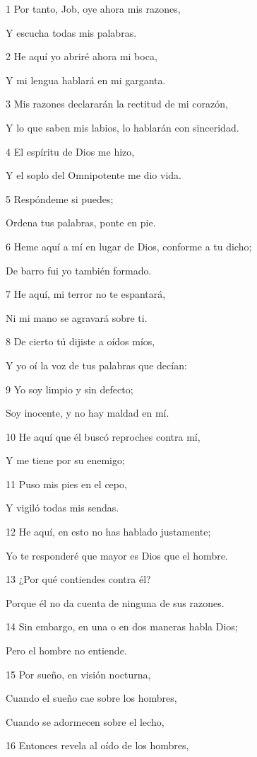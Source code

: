 \par 1 Por tanto, Job, oye ahora mis razones,
\par Y escucha todas mis palabras.
\par 2 He aquí yo abriré ahora mi boca,
\par Y mi lengua hablará en mi garganta.
\par 3 Mis razones declararán la rectitud de mi corazón,
\par Y lo que saben mis labios, lo hablarán con sinceridad.
\par 4 El espíritu de Dios me hizo,
\par Y el soplo del Omnipotente me dio vida.
\par 5 Respóndeme si puedes;
\par Ordena tus palabras, ponte en pie.
\par 6 Heme aquí a mí en lugar de Dios, conforme a tu dicho;
\par De barro fui yo también formado.
\par 7 He aquí, mi terror no te espantará,
\par Ni mi mano se agravará sobre ti.
\par 8 De cierto tú dijiste a oídos míos,
\par Y yo oí la voz de tus palabras que decían: 
\par 9 Yo soy limpio y sin defecto;
\par Soy inocente, y no hay maldad en mí. 
\par 10 He aquí que él buscó reproches contra mí,
\par Y me tiene por su enemigo;
\par 11 Puso mis pies en el cepo,
\par Y vigiló todas mis sendas.
\par 12 He aquí, en esto no has hablado justamente;
\par Yo te responderé que mayor es Dios que el hombre.
\par 13 ¿Por qué contiendes contra él?
\par Porque él no da cuenta de ninguna de sus razones.
\par 14 Sin embargo, en una o en dos maneras habla Dios;
\par Pero el hombre no entiende.
\par 15 Por sueño, en visión nocturna,
\par Cuando el sueño cae sobre los hombres, 
\par Cuando se adormecen sobre el lecho, 
\par 16 Entonces revela al oído de los hombres,
